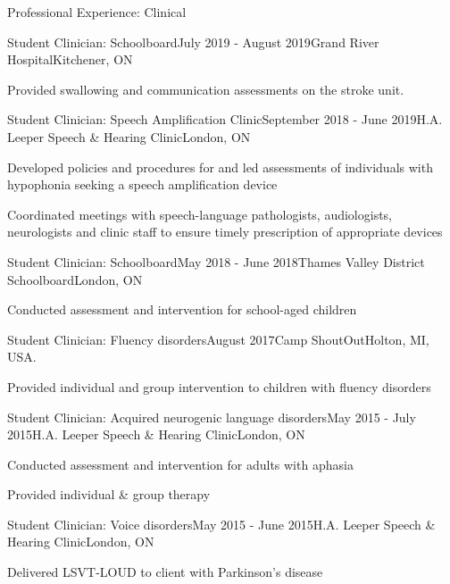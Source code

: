 \documentclass{resume} %
\begin{document}
\begin{rSection}{Professional Experience: Clinical}

	\begin{rSubsection}{Student Clinician: Schoolboard}{July 2019 - August 2019}{Grand River Hospital}{Kitchener, ON}
	\item Provided swallowing and communication assessments on the stroke unit.
	\end{rSubsection}

	\begin{rSubsection}{Student Clinician: Speech Amplification Clinic}{September 2018 - June 2019}{H.A. Leeper Speech \& Hearing Clinic}{London, ON}
	\item Developed policies and procedures for and led assessments of individuals with hypophonia seeking a speech amplification device
	\item Coordinated meetings with speech-language pathologists, audiologists, neurologists and clinic staff to ensure timely prescription of appropriate devices
	\end{rSubsection}

	\begin{rSubsection}{Student Clinician: Schoolboard}{May 2018 - June 2018}{Thames Valley District Schoolboard}{London, ON}
	\item Conducted assessment and intervention for school-aged children
	\end{rSubsection}
	
	\begin{rSubsection}{Student Clinician: Fluency disorders}{August 2017}{Camp ShoutOut}{Holton, MI, USA.}
	\item Provided individual and group intervention to children with fluency disorders
	\end{rSubsection}
	
	
	\begin{rSubsection}{Student Clinician: Acquired neurogenic language disorders}{May 2015 - July 2015}{H.A. Leeper Speech \& Hearing Clinic}{London, ON}
	\item Conducted assessment and intervention for adults with aphasia
	\item Provided individual \& group therapy
	\end{rSubsection}
	
	
	\begin{rSubsection}{Student Clinician: Voice disorders}{May 2015 - June 2015}{H.A. Leeper Speech \& Hearing Clinic}{London, ON}
	\item Delivered LSVT-LOUD to client with Parkinson's disease
	\end{rSubsection}
	

\end{rSection}
\end{document}
